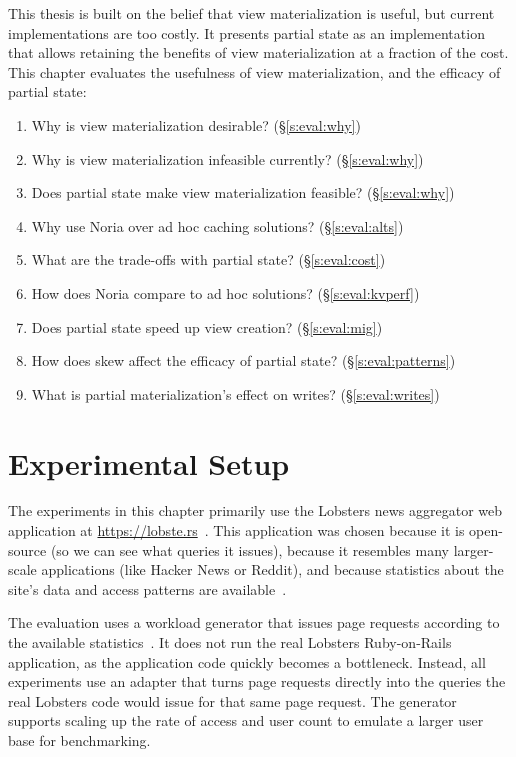 This thesis is built on the belief that view materialization is useful, but
current implementations are too costly. It presents partial state as an
implementation that allows retaining the benefits of view materialization at a
fraction of the cost. This chapter evaluates the usefulness of view
materialization, and the efficacy of partial state:

\begin{enumerate}
  \item Why is view materialization desirable? (\S\ref{s:eval:why})
  \item Why is view materialization infeasible currently? (\S\ref{s:eval:why})
  \item Does partial state make view materialization feasible? (\S\ref{s:eval:why})
  \item Why use Noria over ad hoc caching solutions? (\S\ref{s:eval:alts})
  \item What are the trade-offs with partial state? (\S\ref{s:eval:cost})
  \item How does Noria compare to ad hoc solutions? (\S\ref{s:eval:kvperf})
  \item Does partial state speed up view creation? (\S\ref{s:eval:mig})
  \item How does skew affect the efficacy of partial state? (\S\ref{s:eval:patterns})
  \item What is partial materialization's effect on writes? (\S\ref{s:eval:writes})
\end{enumerate}

\section{Experimental Setup}
\label{s:eval:setup}

The experiments in this chapter primarily use the Lobsters news
aggregator web application at \url{https://lobste.rs}~\cite{lobsters}. This
application was chosen because it is open-source (so we can see what queries it
issues), because it resembles many larger-scale applications (like Hacker News
or Reddit), and because statistics about the site's data and access patterns are
available~\cite{lobsters-data}.

The evaluation uses a workload generator that issues page requests
according to the available statistics~\cite{generator}. It does not run the
real Lobsters Ruby-on-Rails application, as the application code quickly becomes
a bottleneck. Instead, all experiments use an adapter that turns page requests
directly into the queries the real Lobsters code would issue for that same page
request. The generator supports scaling up the rate of access and user count to
emulate a larger user base for benchmarking.

